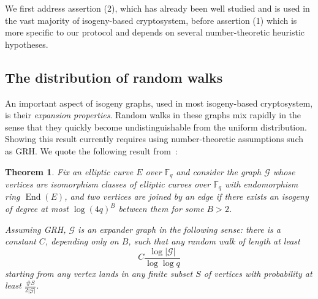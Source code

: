 \documentclass{article}
\newcommand{\F}{\mathbb{F}}
\newcommand{\Graph}{\mathcal{G}}
\newtheorem{theorem}{Theorem}[section]
\theoremstyle{definition}
\newtheorem{prob}[theorem]{Problem}
\DeclareMathOperator{\End}{End}
\DeclareMathOperator{\Card}{Card}
\begin{document}



We first address assertion (2), which has already been well studied and
is used in the vast majority of isogeny-based cryptosystem, before
assertion (1) which is more specific to our protocol and depends on
several number-theoretic heuristic hypotheses.



\subsection{The distribution of random walks}

An important aspect of isogeny graphs, used in most
isogeny-based cryptosystem, is their \emph{expansion properties}.
Random walks in these graphs mix rapidly in the sense that they
quickly become undistinguishable from the uniform distribution.
Showing this result currently requires using number-theoretic
assumptions such as GRH.
We quote the following result from~\cite{jao+miller+venkatesan09}:

\begin{theorem}
Fix an elliptic curve $E$ over $\F_q$ and consider the graph $\Graph$
whose vertices are isomorphism classes of elliptic curves over $\F_q$
with endomorphism ring $\End(E)$, and two vertices are joined by an edge
if there exists an isogeny of degree at most $\log(4q)^B$ between them
for some $B>2$.

Assuming GRH, $\Graph$ is an expander graph in the following sense:
there is a constant $C$, depending only on $B$, such that any random
walk of length at least
\[
	C \frac{\log |\Graph|}{\log\log q}
\]
starting from any vertex lands in any finite subset $S$ of vertices
with probability at least $\frac{\#S}{2|\Graph|}$.
\end{theorem}
\end{document}
